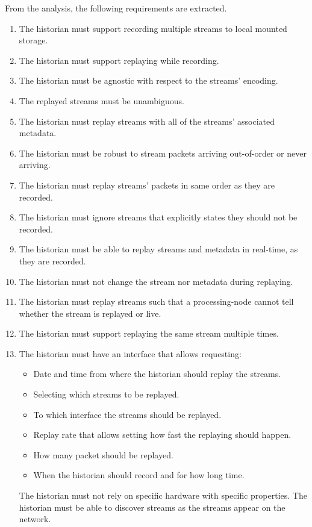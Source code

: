 From the analysis, the following requirements are extracted.
\begin{enumerate}
	\item The historian must support recording multiple streams to local mounted storage.
	\item The historian must support replaying while recording.
	\item The historian must be agnostic with respect to the streams' encoding.
	\item The replayed streams must be unambiguous.
	\item The historian must replay streams with all of the streams' associated metadata.
	\item The historian must be robust to stream packets arriving out-of-order or never arriving.
	\item The historian must replay streams' packets in same order as they are recorded.
	\item The historian must ignore streams that explicitly states they should not be recorded.
	\item The historian must be able to replay streams and metadata in real-time, as they are recorded.
	\item The historian must not change the stream nor metadata during replaying.
	\item The historian must replay streams such that a processing-node cannot tell whether the stream is replayed or live.
	\item The historian must support replaying the same stream multiple times.
	\item The historian must have an interface that allows requesting:
	\begin{itemize}
		\item Date and time from where the historian should replay the streams.
		\item Selecting which streams to be replayed.
		\item To which interface the streams should be replayed. 
		\item Replay rate that allows setting how fast the replaying should happen. 
		\item How many packet should be replayed.
		\item When the historian should record and for how long time.
	\end{itemize}
	The historian must not rely on specific hardware with specific properties.
	The historian must be able to discover streams as the streams appear on the network.
\end{enumerate}

